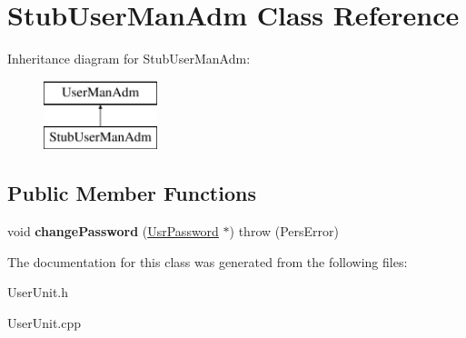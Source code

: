 \hypertarget{classStubUserManAdm}{\section{Stub\-User\-Man\-Adm Class Reference}
\label{dd/dfd/classStubUserManAdm}
}
Inheritance diagram for Stub\-User\-Man\-Adm\-:\begin{figure}[H]
\begin{center}
\leavevmode
\includegraphics[height=2.000000cm]{dd/dfd/classStubUserManAdm}
\end{center}
\end{figure}
\subsection*{Public Member Functions}
\begin{DoxyCompactItemize}
\item 
\hypertarget{classStubUserManAdm_a63130507e95ab092b0bf09704b13b6ec}{void {\bfseries change\-Password} (\hyperlink{classUsrPassword}{Usr\-Password} $\ast$)  throw (\-Pers\-Error)}\label{dd/dfd/classStubUserManAdm_a63130507e95ab092b0bf09704b13b6ec}

\end{DoxyCompactItemize}


The documentation for this class was generated from the following files\-:\begin{DoxyCompactItemize}
\item 
User\-Unit.\-h\item 
User\-Unit.\-cpp\end{DoxyCompactItemize}
